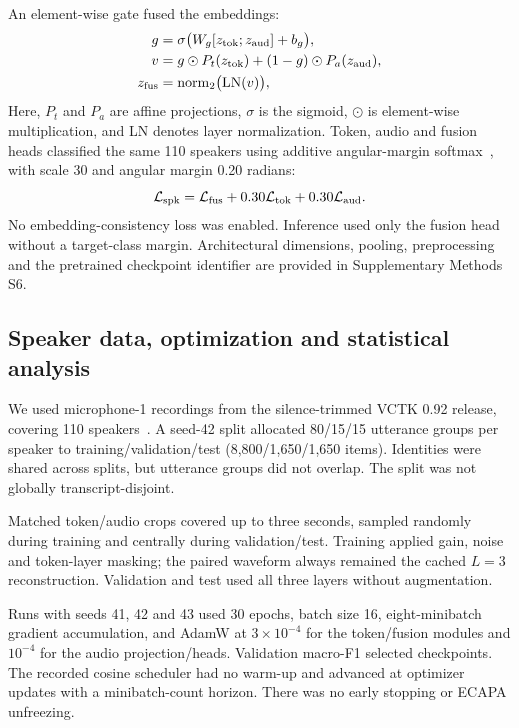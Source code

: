 \documentclass[final,5p,times,twocolumn]{elsarticle}
\begin{document}
An element-wise gate fused the embeddings:
\begin{equation}
\begin{aligned}
 g&=\sigma\bigl(W_g[z_{\rm tok};z_{\rm aud}]+b_g\bigr),\\
 v&=g\odot P_t(z_{\rm tok})+(1-g)\odot P_a(z_{\rm aud}),\\
 z_{\rm fus}&=\operatorname{norm}_2\bigl(\operatorname{LN}(v)\bigr),
\end{aligned}
\end{equation}
Here, $P_t$ and $P_a$ are affine projections, $\sigma$ is the sigmoid, $\odot$ is element-wise multiplication, and LN denotes layer normalization. Token, audio and fusion heads classified the same 110 speakers using additive angular-margin softmax~\cite{arcface}, with scale 30 and angular margin 0.20 radians:
\begin{equation}
 \mathcal L_{\rm spk}
 =\mathcal L_{\rm fus}
  +0.30\mathcal L_{\rm tok}
  +0.30\mathcal L_{\rm aud}.
\end{equation}
No embedding-consistency loss was enabled. Inference used only the fusion head without a target-class margin. Architectural dimensions, pooling, preprocessing and the pretrained checkpoint identifier are provided in Supplementary Methods S6.

\subsection{Speaker data, optimization and statistical analysis}
We used microphone-1 recordings from the silence-trimmed VCTK 0.92 release, covering 110 speakers~\cite{vctk}. A seed-42 split allocated 80/15/15 utterance groups per speaker to training/validation/test (8,800/1,650/1,650 items). Identities were shared across splits, but utterance groups did not overlap. The split was not globally transcript-disjoint.

Matched token/audio crops covered up to three seconds, sampled randomly during training and centrally during validation/test. Training applied gain, noise and token-layer masking; the paired waveform always remained the cached $L=3$ reconstruction. Validation and test used all three layers without augmentation.

Runs with seeds 41, 42 and 43 used 30 epochs, batch size 16, eight-minibatch gradient accumulation, and AdamW at $3\times10^{-4}$ for the token/fusion modules and $10^{-4}$ for the audio projection/heads. Validation macro-F1 selected checkpoints. The recorded cosine scheduler had no warm-up and advanced at optimizer updates with a minibatch-count horizon. There was no early stopping or ECAPA unfreezing.
\end{document}
